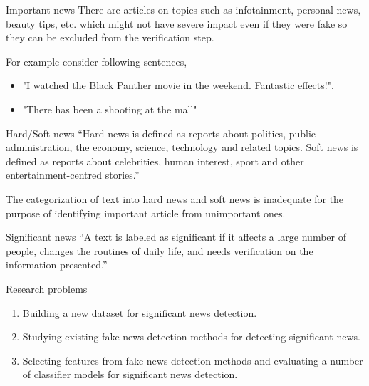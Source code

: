 \documentclass[12pt]{beamer}
\begin{document}
\begin{frame}{Important news}
    There are articles on topics such as infotainment, personal news, beauty tips, etc. which might not have severe impact even if they were fake so they can be excluded from the
    verification step.

    For example consider following sentences,
    \begin{itemize}
        \item "I watched the Black Panther movie in the weekend. Fantastic effects!". 
        \item "There has been a shooting at the mall"
    \end{itemize}
\end{frame}

\begin{frame}{Hard/Soft news}
    \enquote{Hard news is defined as reports about politics, public administration, the economy, science, technology and related topics. Soft news is defined as reports about celebrities, human interest, sport and other entertainment-centred stories.} \cite{reinemann2012hard}

    The categorization of text into hard news and soft news is inadequate for the purpose of identifying important article from unimportant ones.
\end{frame}

\begin{frame}{Significant news}
    \enquote{A text is labeled as significant if it affects a large number of people, changes the routines of daily life, and needs verification on the information presented.}
\end{frame}

\begin{frame}{Research problems}
    \begin{enumerate}
        \item Building a new dataset for significant news detection.
        \item Studying existing fake news detection methods for detecting significant news.
        \item Selecting features from fake news detection methods and evaluating a number of classifier models for significant news detection.
    \end{enumerate}
\end{frame}
\end{document}
